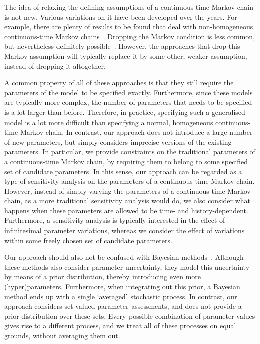 \documentclass[10pt,a4paper]{paper}
\theoremstyle{definition}
\begin{document}
The idea of relaxing the defining assumptions of a continuous-time Markov chain is not new. Various variations on it have been developed over the years.
For example, there are plenty of results to be found that deal with non-homogeneous continuous-time Markov chains~\cite{rindos1995exact,aalen1978empirical,johnson1989nonhomogeneous}.
Dropping the Markov condition is less common, but nevertheless definitely possible~\cite{Harlamov:1320525}. However, the approaches that drop this Markov assumption will typically replace it by some other, weaker assumption, instead of dropping it altogether. 

A common property of all of these approaches is that they still require the parameters of the model to be specified exactly. Furthermore, since these models are typically more complex, the number of parameters that needs to be specified is a lot larger than before. Therefore, in practice, specifying such a generalised model is a lot more difficult than specifying a normal, homogeneous continuous-time Markov chain.
In contrast, our approach does not introduce a large number of new parameters, but simply considers imprecise versions of the existing parameters. In particular, we provide constraints on the traditional parameters of a continuous-time Markov chain, by requiring them to belong to some specified set of candidate parameters.
In this sense, our approach can be regarded as a type of sensitivity analysis on the parameters of a continuous-time Markov chain. However, instead of simply varying the parameters of a continuous-time Markov chain, as a more traditional sensitivity analysis would do, we also consider what happens when these parameters are allowed to be time- and history-dependent. Furthermore, a sensitivity analysis is typically interested in the effect of infinitesimal parameter variations, whereas we consider the effect of variations within some freely chosen set of candidate parameters.

Our approach should also not be confused with Bayesian methods~\cite{insua2012bayesian}. Although these methods also consider parameter uncertainty, they model this uncertainty by means of a prior distribution, thereby introducing even more (hyper)parameters. Furthermore, when integrating out this prior, a Bayesian method ends up with a single `averaged' stochastic process. In contrast, our approach considers set-valued parameter assessments, and does not provide a prior distribution over these sets. Every possible combination of parameter values gives rise to a different process, and we treat all of these processes on equal grounds, without averaging them out.
\end{document}

